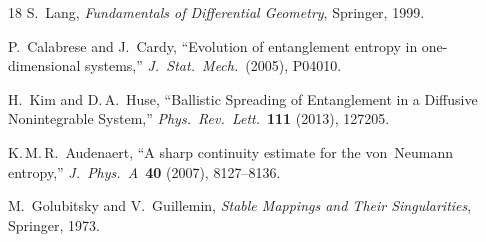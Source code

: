 \documentclass[12pt,a4paper]{amsart}
\theoremstyle{plain}
\theoremstyle{definition}
\theoremstyle{remark}
\begin{document}
\begin{thebibliography}{18}
S.~Lang,
\emph{Fundamentals of Differential Geometry}, Springer, 1999.

P.~Calabrese and J.~Cardy,
``Evolution of entanglement entropy in one-dimensional systems,''
\emph{J.\ Stat.\ Mech.}\ (2005), P04010.

H.~Kim and D.\,A.~Huse,
``Ballistic Spreading of Entanglement in a Diffusive Nonintegrable
System,''
\emph{Phys.\ Rev.\ Lett.}\ \textbf{111} (2013), 127205.

K.\,M.\,R.~Audenaert,
``A sharp continuity estimate for the von~Neumann entropy,''
\emph{J.\ Phys.\ A}\ \textbf{40} (2007), 8127--8136.

M.~Golubitsky and V.~Guillemin,
\emph{Stable Mappings and Their Singularities}, Springer, 1973.

\end{thebibliography}
\end{document}
